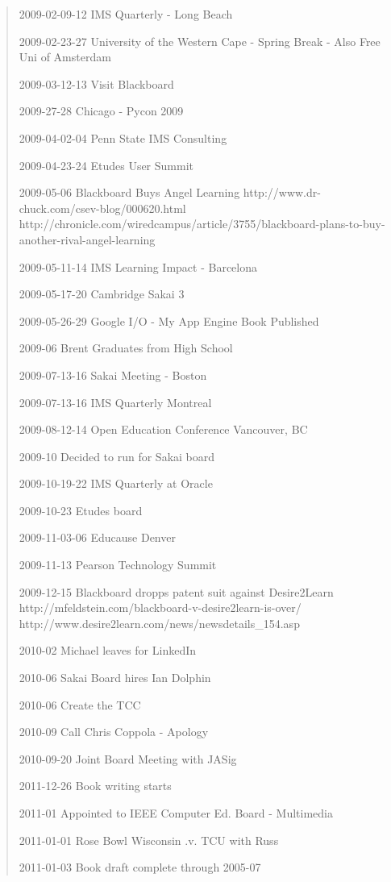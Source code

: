 \begin{quote}
2009-02-09-12 IMS Quarterly - Long Beach

2009-02-23-27 University of the Western Cape - Spring Break - Also Free Uni of Amsterdam

2009-03-12-13 Visit Blackboard

2009-27-28 Chicago - Pycon 2009

2009-04-02-04 Penn State IMS Consulting

2009-04-23-24 Etudes User Summit

2009-05-06 Blackboard Buys Angel Learning
http://www.dr-chuck.com/csev-blog/000620.html
http://chronicle.com/wiredcampus/article/3755/blackboard-plans-to-buy-another-rival-angel-learning

2009-05-11-14 IMS Learning Impact - Barcelona

2009-05-17-20 Cambridge Sakai 3

2009-05-26-29 Google I/O - My App Engine Book Published

2009-06 Brent Graduates from High School

2009-07-13-16 Sakai Meeting - Boston

2009-07-13-16 IMS Quarterly Montreal

2009-08-12-14 Open Education Conference Vancouver, BC

2009-10 Decided to run for Sakai board

2009-10-19-22 IMS Quarterly at Oracle

2009-10-23 Etudes board

2009-11-03-06 Educause Denver 

2009-11-13 Pearson Technology Summit

2009-12-15 Blackboard dropps patent suit against Desire2Learn
http://mfeldstein.com/blackboard-v-desire2learn-is-over/
http://www.desire2learn.com/news/newsdetails_154.asp

2010-02 Michael leaves for LinkedIn

2010-06 Sakai Board hires Ian Dolphin

2010-06 Create the TCC

2010-09 Call Chris Coppola - Apology

2010-09-20 Joint Board Meeting with JASig

2011-12-26 Book writing starts

2011-01 Appointed to IEEE Computer Ed. Board - Multimedia 

2011-01-01 Rose Bowl Wisconsin .v. TCU with Russ

2011-01-03 Book draft complete through 2005-07


\end{quote}
